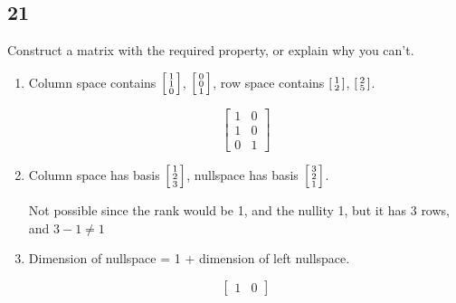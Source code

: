 \documentclass[12pt,letterpaper]{article}
\begin{document}
    \subsection*{21}
      Construct a matrix with the required property, or explain why you can't.
      \begin{enumerate}
        \item
          Column space contains $\begin{bsmallmatrix}1 \\ 1 \\ 0\end{bsmallmatrix}$, $\begin{bsmallmatrix}0 \\ 0 \\ 1\end{bsmallmatrix}$, row space contains $\begin{bsmallmatrix}1 \\ 2\end{bsmallmatrix}$, $\begin{bsmallmatrix}2 \\ 5\end{bsmallmatrix}$.

            \[
              \begin{bmatrix}
                1 & 0 \\
                1 & 0 \\
                0 & 1
              \end{bmatrix}
            \]

        \item
          Column space has basis $\begin{bsmallmatrix}1 \\ 2 \\ 3\end{bsmallmatrix}$, nullspace has basis $\begin{bsmallmatrix}3 \\ 2 \\ 1\end{bsmallmatrix}$.

          Not possible since the rank would be 1, and the nullity 1, but it has 3 rows, and $3 - 1 \ne 1$

        \item
          Dimension of nullspace = 1 + dimension of left nullspace.

          \[
            \begin{bmatrix}
              1 & 0
            \end{bmatrix}
          \]


\end{enumerate}
\end{document}
